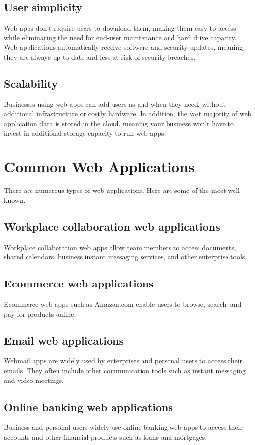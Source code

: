 \documentclass[conference]{IEEEtran}
\begin{document}
\subsection{User simplicity}
Web apps don't require users to download them, making them easy to access while eliminating the need for end-user maintenance and hard drive capacity. Web applications automatically receive software and security updates, meaning they are always up to date and less at risk of security breaches. 

\subsection{Scalability}
Businesses using web apps can add users as and when they need, without additional infrastructure or costly hardware. In addition, the vast majority of web application data is stored in the cloud, meaning your business won't have to invest in additional storage capacity to run web apps.

\section{Common Web Applications}
There are numerous types of web applications. Here are some of the most well-known.

\subsection{Workplace collaboration web applications}
Workplace collaboration web apps allow team members to access documents, shared calendars, business instant messaging services, and other enterprise tools.

\subsection{Ecommerce web applications}
Ecommerce web apps such as Amazon.com enable users to browse, search, and pay for products online.

\subsection{Email web applications}
Webmail apps are widely used by enterprises and personal users to access their emails. They often include other communication tools such as instant messaging and video meetings.

\subsection{Online banking web applications}
Business and personal users widely use online banking web apps to access their accounts and other financial products such as loans and mortgages.
\end{document}
